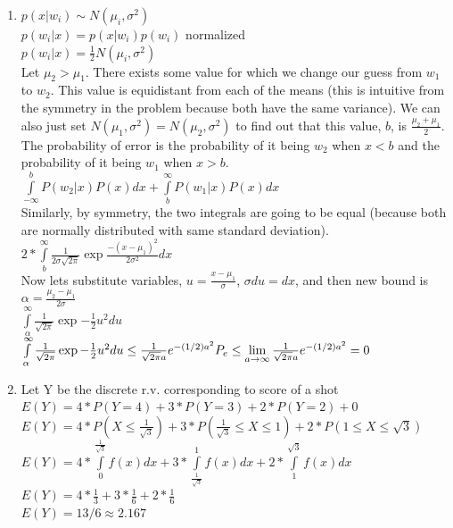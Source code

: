\documentclass[11pt]{article}
\begin{document}
\begin{enumerate}
\item
$p(x|w_i)\sim N(\mu_i, \sigma^2)$\\
$p(w_i|x)=p(x|w_i)p(w_i)$ normalized\\
$p(w_i|x)=\frac{1}{2}N(\mu_i, \sigma^2)$\\
Let $\mu_2 > \mu_1$. There exists some value for which we change our guess from $w_1$ to $w_2$. This value is equidistant from each of the means (this is intuitive from the symmetry in the problem because both have the same variance). We can also just set $N(\mu_1, \sigma^2)=N(\mu_2, \sigma^2)$ to find out that this value, $b$, is $\frac{\mu_2+\mu_1}{2}$. The probability of error is the probability of it being $w_2$ when $x<b$ and the probability of it being $w_1$ when $x>b$.\\
$\int\limits_{-\infty}^{b}P(w_2|x)P(x)dx + \int\limits_{b}^{\infty}P(w_1|x)P(x)dx$\\
Similarly, by symmetry, the two integrals are going to be equal (because both are normally distributed with same standard deviation).\\
$2*\int\limits_{b}^{\infty}\frac{1}{2\sigma\sqrt{2\pi}}\exp{\frac{-(x-\mu_1)^2}{2\sigma^2}}dx$\\
Now lets substitute variables, $u=\frac{x-\mu_1}{\sigma}$, $\sigma du=dx$, 
and then new bound is $\alpha = \frac{\mu_2-\mu_1}{2\sigma}$\\
$\int\limits_{\alpha}^{\infty}\frac{1}{\sqrt{2\pi}}\exp{-\frac{1}{2}u^2}du$\\
$\int\limits_{\alpha}^{\infty}\frac{1}{\sqrt{2\pi}}\exp{-\frac{1}{2}u^2}du\le \frac{1}{\sqrt{2\pi}a}e^{-(1/2)a^2}\\
P_e\le\lim\limits_{a\to \infty}\frac{1}{\sqrt{2\pi}a}e^{-(1/2)a^2}=0\\
$
\item Let Y be the discrete r.v. corresponding to score of a shot \\
$E(Y)=4*P(Y=4)+3*P(Y=3)+2*P(Y=2)+0$\\
$E(Y)=4*P(X\le \frac{1}{\sqrt{3}})+3*P(\frac{1}{\sqrt{3}}\le X\le 1)+2*P(1\le X\le \sqrt{3})$\\
$E(Y)=4*\int\limits_{0}^{\frac{1}{\sqrt{3}}}f(x)dx+3*\int\limits_{\frac{1}{\sqrt{3}}}^{1}f(x)dx+2*\int\limits_{1}^{\sqrt{3}}f(x)dx$\\
$E(Y)=4*\frac{1}{3}+3*\frac{1}{6}+2*\frac{1}{6}$\\
$E(Y)=13/6\approx 2.167$


\end{enumerate}
\end{document}
